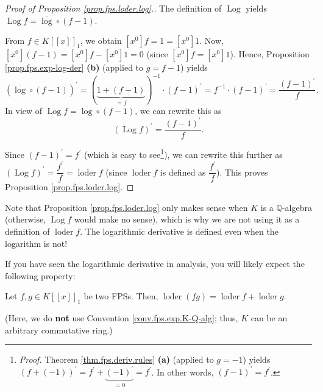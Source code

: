 \begin{proof}
[Proof of Proposition \ref{prop.fps.loder.log}.]The definition of
$\operatorname*{Log}$ yields $\operatorname*{Log}f=\overline{\log}\circ\left(
f-1\right)  $.

From $f\in K\left[  \left[  x\right]  \right]  _{1}$, we obtain $\left[
x^{0}\right]  f=1=\left[  x^{0}\right]  1$. Now, $\left[  x^{0}\right]
\left(  f-1\right)  =\left[  x^{0}\right]  f-\left[  x^{0}\right]  1=0$ (since
$\left[  x^{0}\right]  f=\left[  x^{0}\right]  1$). Hence, Proposition
\ref{prop.fps.exp-log-der} \textbf{(b)} (applied to $g=f-1$) yields
\[
\left(  \overline{\log}\circ\left(  f-1\right)  \right)  ^{\prime}=\left(
\underbrace{1+\left(  f-1\right)  }_{=f}\right)  ^{-1}\cdot\left(  f-1\right)
^{\prime}=f^{-1}\cdot\left(  f-1\right)  ^{\prime}=\dfrac{\left(  f-1\right)
^{\prime}}{f}.
\]
In view of $\operatorname*{Log}f=\overline{\log}\circ\left(  f-1\right)  $, we
can rewrite this as%
\[
\left(  \operatorname*{Log}f\right)  ^{\prime}=\dfrac{\left(  f-1\right)
^{\prime}}{f}.
\]


Since $\left(  f-1\right)  ^{\prime}=f^{\prime}$ (which is easy to
see\footnote{\textit{Proof.} Theorem \ref{thm.fps.deriv.rules} \textbf{(a)}
(applied to $g=-1$) yields $\left(  f+\left(  -1\right)  \right)  ^{\prime
}=f^{\prime}+\underbrace{\left(  -1\right)  ^{\prime}}_{=0}=f^{\prime}$. In
other words, $\left(  f-1\right)  ^{\prime}=f^{\prime}$.}), we can rewrite
this further as $\left(  \operatorname*{Log}f\right)  ^{\prime}=\dfrac
{f^{\prime}}{f}=\operatorname*{loder}f$ (since $\operatorname*{loder}f$ is
defined as $\dfrac{f^{\prime}}{f}$). This proves Proposition
\ref{prop.fps.loder.log}.
\end{proof}

Note that Proposition \ref{prop.fps.loder.log} only makes sense when $K$ is a
$\mathbb{Q}$-algebra (otherwise, $\operatorname*{Log}f$ would make no sense),
which is why we are not using it as a definition of $\operatorname*{loder}f$.
The logarithmic derivative is defined even when the logarithm is not!

If you have seen the logarithmic derivative in analysis, you will likely
expect the following property:

\begin{proposition}
\label{prop.fps.loder.prod}Let $f,g\in K\left[  \left[  x\right]  \right]
_{1}$ be two FPSs. Then, $\operatorname*{loder}\left(  fg\right)
=\operatorname*{loder}f+\operatorname*{loder}g$.

(Here, we do \textbf{not} use Convention \ref{conv.fps.exp.K-Q-alg}; thus, $K$
can be an arbitrary commutative ring.)
\end{proposition}

